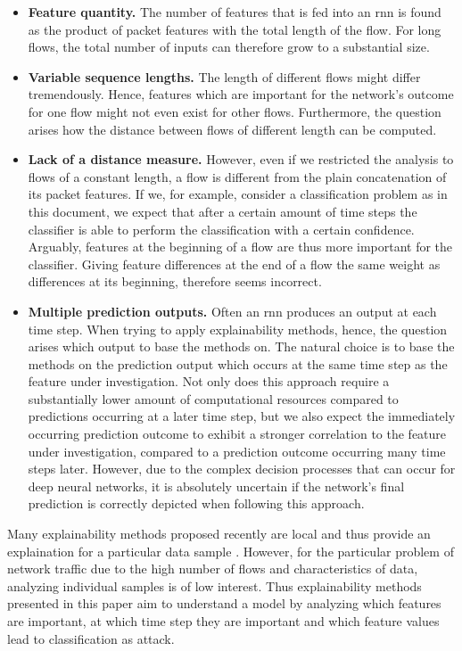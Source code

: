 \documentclass[conference]{IEEEtran}
\begin{document}
\begin{itemize}[topsep=0pt,wide,labelwidth=!,labelindent=0pt]
\item
\textbf{Feature quantity.}
The number of features that is fed into an \gls{rnn} is found as the product of packet features with the total length of the flow. For long flows, the total number of inputs can therefore grow to a substantial size.

\item
\textbf{Variable sequence lengths.}
The length of different flows might differ tremendously. Hence, features which are important for the network's outcome for one flow might not even exist for other flows. Furthermore, the question arises how the distance between flows of different length can be computed.

\item
\textbf{Lack of a distance measure.}
However, even if we restricted the analysis to flows of a constant length, a flow is different from the plain concatenation of its packet features.
If we, for example, consider a classification problem as in this document, we expect that after a certain amount of time steps the classifier is able to perform the classification with a certain confidence. Arguably, features at the beginning of a flow are thus more important for the classifier. Giving feature differences at the end of a flow the same weight as differences at its beginning, therefore seems incorrect.

\item
\textbf{Multiple prediction outputs.}
Often an \gls{rnn} produces an output at each time step. When trying to apply explainability methods, hence, the question arises which output to base the methods on. The natural choice is to base the methods on the prediction output which occurs at the same time step as the feature under investigation. Not only does this approach require a substantially lower amount of computational resources compared to predictions occurring at a later time step, but we also expect the immediately occurring prediction outcome to exhibit a stronger correlation to the feature under investigation, compared to a prediction outcome occurring many time steps later.
However, due to the complex decision processes that can occur for deep neural networks, it is absolutely  uncertain if the network's final prediction is correctly depicted when following this approach.
\end{itemize}

Many explainability methods proposed recently are local and thus provide an explaination for a particular data sample \cite{shapley_value_1953,lundberg_unified_2017,dhurandhar_model_2018,ribeiro_why_2016}. However, for the particular problem of network traffic due to the high number of flows and characteristics of data, analyzing individual samples is of low interest. Thus explainability methods presented in this paper aim to understand a model by analyzing which features are important, at which time step they are important and which feature values lead to classification as attack.
\end{document}
